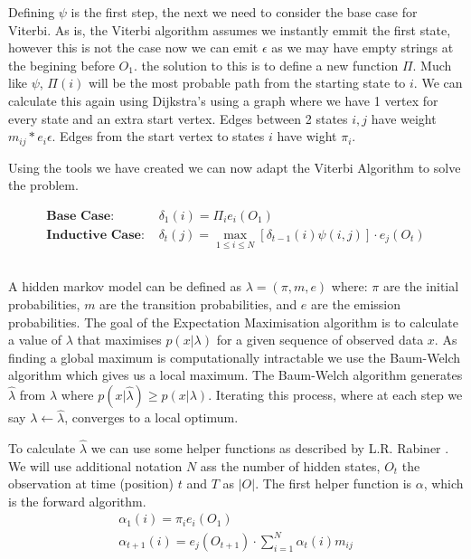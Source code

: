 Defining $\psi$ is the first step, the next we need to consider the base case for Viterbi. As is, the Viterbi algorithm assumes we instantly emmit the first state, however this is not the case now we can emit $\epsilon$ as we may have empty strings at the begining before $O_1$. the solution to this is to define a new function $\Pi$. Much like $\psi$, $\Pi(i)$ will be the most probable path from the starting state to $i$. We can calculate this again using Dijkstra's using a graph where we have 1 vertex for every state and an extra start vertex. Edges between 2 states $i,j$ have weight $m_{ij}*e_i{\epsilon}$. Edges from the start vertex to states $i$ have wight $\pi_i$.

Using the tools we have created we can now adapt the Viterbi Algorithm to solve the problem.


\begin{align*}
    \textbf{Base Case: } &\delta_1(i) = \Pi_i e_i(O_1)\\
    \textbf{Inductive Case: } &\delta_t(j) = \max_{1\leq i \leq N}[\delta_{t-1}(i)\psi(i,j)]\cdot e_j(O_t)
    \end{align*}
\subsection{}
A hidden markov model can be defined as $\lambda = (\pi, m, e)$ where: $\pi$ are the initial probabilities, $m$ are the transition probabilities, and $e$ are the emission probabilities.
The goal of the Expectation Maximisation algorithm is to calculate a value of $\lambda$ that maximises $p(x|\lambda)$ for a given sequence of observed data $x$. As finding a global maximum is computationally intractable we use the Baum-Welch algorithm which gives us a local maximum. The Baum-Welch algorithm generates $\hat{\lambda}$ from $\lambda$ where $p(x|\hat{\lambda}) \geq p(x|\lambda)$. Iterating this process, where at each step we say $\lambda \gets \hat{\lambda}$, converges to a local optimum.

To calculate $\hat{\lambda}$ we can use some helper functions as described by L.R. Rabiner \cite{em}. We will use additional notation $N$ ass the number of hidden states, $O_t$ the observation at time (position) $t$ and $T$ as $|O|$.  The first helper function is $\alpha$, which is the forward algorithm.
\begin{gather*}
    \alpha_1(i) = \pi_i e_i(O_1)\\
    \alpha_{t+1}(i) = e_j(O_{t+1}) \cdot \sum_{i=1}^N\alpha_t(i)m_{ij}
\end{gather*}


